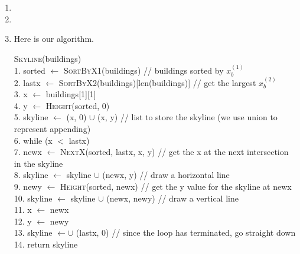 \documentclass{article}
\begin{document}
\begin{enumerate}
    \item
    \item
    \item Here is our algorithm.
    \begin{algorithm}
        \textsc{Skyline}(buildings) \\
        1. \hspace{0em} sorted $\leftarrow$ \textsc{SortByX1}(buildings) \hspace{2em} // buildings sorted by $x_b^{(1)}$ \\
        2. \hspace{0em} lastx $\leftarrow$ \textsc{SortByX2}(buildings)[len(buildings)] \hspace{2em} // get the largest $x_b^{(2)}$\\
        3. \hspace{0em} x $\leftarrow$ buildings[1][1] \\
        4. \hspace{0em} y $\leftarrow$ \textsc{Height}(sorted, 0) \\
        5. \hspace{0em} skyline $\leftarrow$ (x, 0) $\cup$ (x, y) \hspace{2em} // list to store the skyline (we use union to represent appending) \\
        6. \hspace{0em} while (x $<$ lastx) \\
        7. \hspace{2em} newx $\leftarrow$ \textsc{NextX}(sorted, lastx, x, y) \hspace{2em} // get the x at the next intersection in the skyline \\
        8. \hspace{2em} skyline $\leftarrow$ skyline $\cup$ (newx, y) \hspace{2em} // draw a horizontal line \\
        9. \hspace{2em} newy $\leftarrow$ \textsc{Height}(sorted, newx) \hspace{2em} // get the y value for the skyline at newx \\
        10. \hspace{1.5em} skyline $\leftarrow$ skyline $\cup$ (newx, newy) \hspace{2em} // draw a vertical line \\
        11. \hspace{1.5em} x $\leftarrow$ newx \\
        12. \hspace{1.5em} y $\leftarrow$ newy \\
        13. skyline $\leftarrow \cup$ (lastx, 0) // since the loop has terminated, go straight down \\
        14. return skyline \\\\


\end{algorithm}
\end{enumerate}
\end{document}
